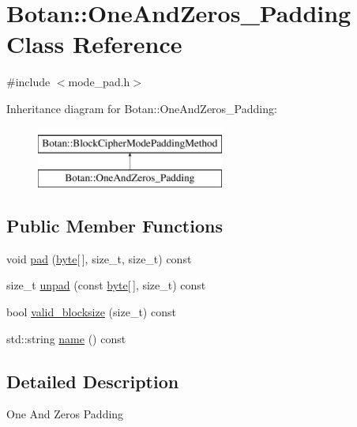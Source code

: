 \hypertarget{classBotan_1_1OneAndZeros__Padding}{\section{Botan\-:\-:One\-And\-Zeros\-\_\-\-Padding Class Reference}
\label{classBotan_1_1OneAndZeros__Padding}
}


{\ttfamily \#include $<$mode\-\_\-pad.\-h$>$}

Inheritance diagram for Botan\-:\-:One\-And\-Zeros\-\_\-\-Padding\-:\begin{figure}[H]
\begin{center}
\leavevmode
\includegraphics[height=2.000000cm]{classBotan_1_1OneAndZeros__Padding}
\end{center}
\end{figure}
\subsection*{Public Member Functions}
\begin{DoxyCompactItemize}
\item 
void \hyperlink{classBotan_1_1OneAndZeros__Padding_ac57244db8d884db0a5490da4ebd0b1a2}{pad} (\hyperlink{namespaceBotan_a7d793989d801281df48c6b19616b8b84}{byte}\mbox{[}$\,$\mbox{]}, size\-\_\-t, size\-\_\-t) const 
\item 
size\-\_\-t \hyperlink{classBotan_1_1OneAndZeros__Padding_aad73ce5c1ed805f34462f5cfb0e70620}{unpad} (const \hyperlink{namespaceBotan_a7d793989d801281df48c6b19616b8b84}{byte}\mbox{[}$\,$\mbox{]}, size\-\_\-t) const 
\item 
bool \hyperlink{classBotan_1_1OneAndZeros__Padding_a0041a5a201b749865abf101be6fec56a}{valid\-\_\-blocksize} (size\-\_\-t) const 
\item 
std\-::string \hyperlink{classBotan_1_1OneAndZeros__Padding_a3c0ba7795dcf2fc0e02551af58c9c199}{name} () const 
\end{DoxyCompactItemize}


\subsection{Detailed Description}
One And Zeros Padding 

